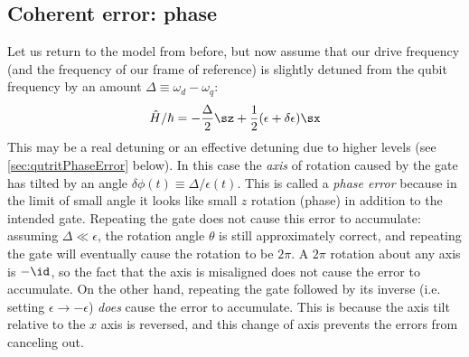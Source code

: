 \subsection{Coherent error: phase}
Let us return to the model from before, but now assume that our drive frequency (and the frequency of our frame of reference) is slightly detuned from the qubit frequency by an amount $\Delta \equiv \omega_d-\omega_q$:
\begin{equation}
    \label{eq:errorHam}
    \hat{H}/\hbar = -\frac{\Delta}{2}\sz + \frac{1}{2}(\epsilon + \delta\epsilon)\sx
\end{equation}
This may be a real detuning or an effective detuning due to higher levels (see \cref{sec:qutritPhaseError} below). In this case the \emph{axis} of rotation caused by the gate has tilted by an angle $\delta\phi(t)\equiv \Delta/\epsilon(t)$. This is called a \textit{phase error} because in the limit of small angle it looks like small $z$ rotation (phase) in addition to the intended gate. Repeating the gate does not cause this error to accumulate: assuming $\Delta\ll\epsilon$, the rotation angle $\theta$ is still approximately correct, and repeating the gate will eventually cause the rotation to be $2\pi$. A $2\pi$ rotation about any axis is $-\id$, so the fact that the axis is misaligned does not cause the error to accumulate. On the other hand, repeating the gate followed by its inverse (i.e. setting $\epsilon\rightarrow-\epsilon$) \textit{does} cause the error to accumulate. This is because the axis tilt relative to the $x$ axis is reversed, and this change of axis prevents the errors from canceling out.
